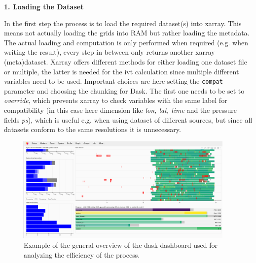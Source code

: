 \textbf{1. Loading the Dataset}

In the first step the process is to load the required dataset(s) into xarray. 
This means not actually loading the grids into RAM but rather loading the metadata. 
The actual loading and computation is only performed when required (e.g. when writing the result), every step in between only returns another xarray (meta)dataset. 
Xarray offers different methods for either loading one dataset file or multiple, the latter is needed for the \ac{ivt} calculation since multiple different variables need to be used. 
Important choices are here setting the \texttt{compat} parameter and choosing the chunking for Dask. 
The first one needs to be set to \textit{override}, which prevents xarray to check variables with the same label for compatibility (in this case here dimension like \textit{lon, lat, time} and the pressure fields \textit{ps}), which is useful e.g. when using dataset of different sources, but since all datasets conform to the same resolutions it is unnecessary. 

\begin{figure}[htb]
  \begin{center}
    \includegraphics[width=0.95\textwidth]{figures/dask_dashboard_example.png}
  \end{center}
  \caption{Example of the general overview of the dask dashboard used for analyzing the efficiency of the process.}
  \label{fig:dask-dashboard}
\end{figure}


